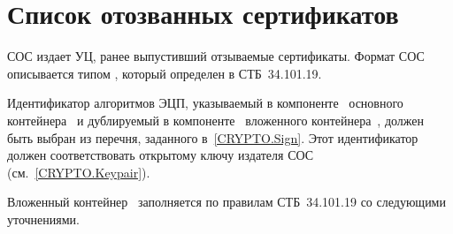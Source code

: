 \section{Список отозванных сертификатов}\label{FMT.CRL}

СОС издает УЦ, ранее выпустивший отзываемые сертификаты. Формат СОС описывается 
типом , который определен в СТБ~34.101.19. 

Идентификатор алгоритмов ЭЦП, указываемый в компоненте~
основного контейнера~ и дублируемый в
компоненте~ вложенного контейнера~, должен
быть выбран из перечня, заданного в~\ref{CRYPTO.Sign}. Этот идентификатор должен
соответствовать открытому ключу издателя СОС (см.~\ref{CRYPTO.Keypair}).

Вложенный контейнер~ заполняется по правилам СТБ~34.101.19 со
следующими уточнениями.

